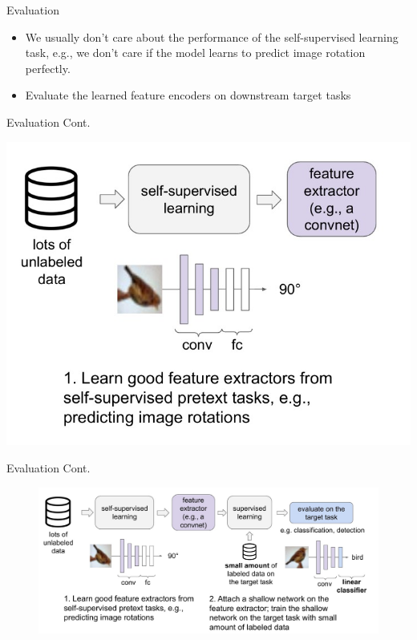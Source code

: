 \documentclass[serif, aspectratio=169]{beamer}
\begin{document}
%


\begin{frame}{Evaluation}
    \begin{itemize}
       \item We usually don’t care about the performance of the self-supervised learning task, e.g., we don’t care if the model learns to predict image 
rotation perfectly.
 \item Evaluate the learned feature encoders on downstream target tasks

    \end{itemize}
\end{frame}

\begin{frame}{Evaluation Cont.}
        
     \begin{flushleft}
           \includegraphics[keepaspectratio, scale=0.5]{pic/Evaluation-1.jpg}
\end{flushleft}
  
\end{frame}


\begin{frame}{Evaluation Cont.}
        \begin{figure}[htpb]
   
           \includegraphics[keepaspectratio, scale=0.5]{pic/Evaluation-2.jpg}

    \end{figure}
\end{frame}
\end{document}
